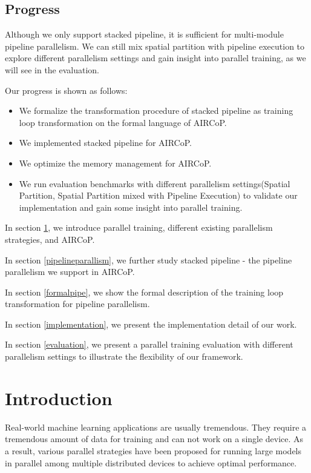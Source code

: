 \documentclass[sigplan, nonacm]{acmart}\settopmatter{printfolios=true,printccs=false,printacmref=false}
\begin{document}
\subsection{Progress}
Although we only support stacked pipeline, it is sufficient for multi-module pipeline parallelism. We can still mix spatial partition with pipeline execution to explore different parallelism settings and gain insight into parallel training, as we will see in the evaluation.\par
Our progress is shown as follows:
\begin{itemize}
  \item We formalize the transformation procedure of stacked pipeline as training loop transformation on the formal language of AIRCoP.
  \item We implemented stacked pipeline for AIRCoP.
  \item We optimize the memory management for AIRCoP.
  \item We run evaluation benchmarks with different parallelism settings(Spatial Partition, Spatial Partition mixed with Pipeline Execution) to validate our implementation and gain some insight into parallel training.
\end{itemize} \par
In section \ref{introduction}, we introduce parallel training, different existing parallelism strategies, and AIRCoP.\par
In section \ref{pipelineparallism}, we further study stacked pipeline - the pipeline parallelism we support in AIRCoP.\par
In section \ref{formalpipe}, we show the formal description of the training loop transformation for pipeline parallelism.\par
In section \ref{implementation}, we present the implementation detail of our work.\par
In section \ref{evaluation}, we present a parallel training evaluation with different parallelism settings to illustrate the flexibility of our framework.
\section{Introduction} \label{introduction}
 Real-world machine learning applications are usually tremendous. They require a tremendous amount of data for training and can not work on a single device. As a result, various parallel strategies have been proposed for running large models in parallel among multiple distributed devices to achieve optimal performance.\par
\end{document}
